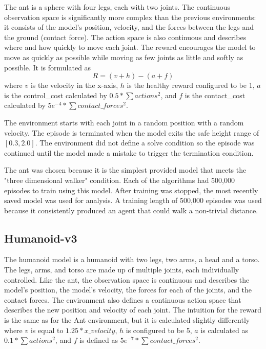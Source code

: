 \documentclass[conference]{IEEEtran}
\begin{document}
The ant is a sphere with four legs, each with two joints. The continuous observation space is significantly more complex than the previous environments: it consists of the model's position, velocity, and the forces between the legs and the ground (contact force). The action space is also continuous and describes where and how quickly to move each joint. The reward encourages the model to move as quickly as possible while moving as few joints as little and softly as possible. It is formulated as
$$
    R = (v + h) - (a + f)
$$
where $v$ is the velocity in the x-axis, $h$ is the healthy reward configured to be 1, $a$ is the control\_cost calculated by $0.5* \sum actions^{2}$, and $f$ is the contact\_cost calculated by $5e^{-4} * \sum contact\_forces^{2}$.

The environment starts with each joint in a random position with a random velocity. The episode is terminated when the model exits the safe height range of $[0.3, 2.0]$. The environment did not define a solve condition so the episode was continued until the model made a mistake to trigger the termination condition.

The ant was chosen because it is the simplest provided model that meets the "three dimensional walker" condition. Each of the algorithms had 500,000 episodes to train using this model. After training was stopped, the most recently saved model was used for analysis. A training length of 500,000 episodes was used because it consistently produced an agent that could walk a non-trivial distance.

\subsection{Humanoid-v3}

The humanoid model is a humanoid with two legs, two arms, a head and a torso. The legs, arms, and torso are made up of multiple joints, each individually controlled. Like the ant, the observation space is continuous and describes the model's position, the model's velocity, the forces for each of the joints, and the contact forces. The environment also defines a continuous action space that describes the new position and velocity of each joint. The intuition for the reward is the same as for the Ant environment, but it is calculated slightly differently where $v$ is equal to $1.25 * x\_velocity$, $h$ is configured to be 5, $a$ is calculated as $0.1 * \sum actions^{2}$, and $f$ is defined as $5e^{-7} * \sum contact\_forces^{2}$.
\end{document}
